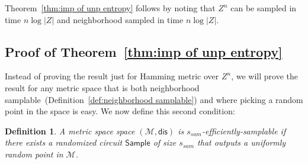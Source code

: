 \documentclass[11pt]{article}
\newcommand{\thref}[1]{\mbox{Theorem~\ref{#1}}}
\newcommand{\defref}[1]{\mbox{Definition~\ref{#1}}}
\newcommand{\class}[1]{{\ensuremath{\mathsf{#1}}}}
\newcommand{\sample}{\ensuremath{\class{Sample}}\xspace}
\newcommand{\dis}{\ensuremath{\mathsf{dis}}}
\newtheorem{definition}[theorem]{Definition}
\begin{document}
\thref{thm:imp of unp entropy} follows by noting that $Z^n$ can be sampled in time $n\log |Z|$ and neighborhood sampled in time $n\log |Z|$.
\subsection{Proof of \thref{thm:imp of unp entropy}}
\label{sec:proof of imp unp entropy}
Instead of proving the result just for Hamming metric over $Z^n$, we will prove the result for any metric space that is both neighborhood samplable~(\defref{def:neighborhood samplable}) and where picking a random point in the space is easy.  We now define this second condition:
\begin{definition}
A metric space space $(\mathcal{M}, \dis)$ is $s_{sam}$-\emph{efficiently-samplable} if there exists a randomized circuit $\sample$ of size $s_{sam}$ that outputs a uniformly random point in $\mathcal{M}$.
\end{definition}
\end{document}
